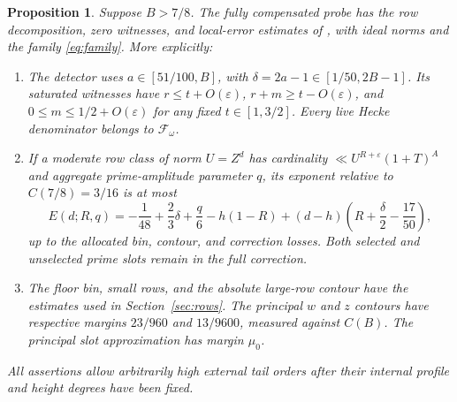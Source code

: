 \documentclass[11pt,a4paper]{article}
\numberwithin{equation}{section}
\newtheorem{proposition}[theorem]{Proposition}
\theoremstyle{definition}
\theoremstyle{remark}
\newcommand{\eps}{\varepsilon}
\newcommand{\cF}{\mathcal F}
\begin{document}
\begin{proposition}\label{prop:physical-high}
Suppose $B>7/8$.  The fully compensated probe has the row decomposition,
zero witnesses, and local-error estimates of \cite[Sections~8--10 and~16]{Q}, with ideal norms and the family \eqref{eq:family}.  More explicitly:
\begin{enumerate}[label=\textup{(\roman*)}]
\item The detector uses $a\in[51/100,B]$, with
$\delta=2a-1\in[1/50,2B-1]$.  Its saturated witnesses have
$r\leq t+O(\eps)$, $r+m\geq t-O(\eps)$, and
$0\leq m\leq1/2+O(\eps)$ for any fixed $t\in[1,3/2]$.
Every live Hecke denominator belongs to $\cF_\omega$.
\item If a moderate row class of norm $U=Z^d$ has cardinality
$\ll U^{R+\eps}(1+T)^A$ and aggregate prime-amplitude parameter $q$,
its exponent relative to $C(7/8)=3/16$ is at most
\begin{equation}\label{eq:physical-row}
 E(d;R,q)= -\frac1{48}+\frac23\delta+\frac q6
   -h(1-R)+(d-h)\left(R+\frac\delta2-\frac{17}{50}\right),
\end{equation}
up to the allocated bin, contour, and correction losses.  Both selected
and unselected prime slots remain in the full correction.
\item The floor bin, small rows, and the absolute large-row contour have
the estimates used in Section~\ref{sec:rows}.  The principal $w$ and $z$
contours have respective margins $23/960$ and $13/9600$, measured against
$C(B)$.  The principal slot approximation has margin $\mu_0$.
\end{enumerate}
All assertions allow arbitrarily high external tail orders after their
internal profile and height degrees have been fixed.
\end{proposition}
\end{document}
